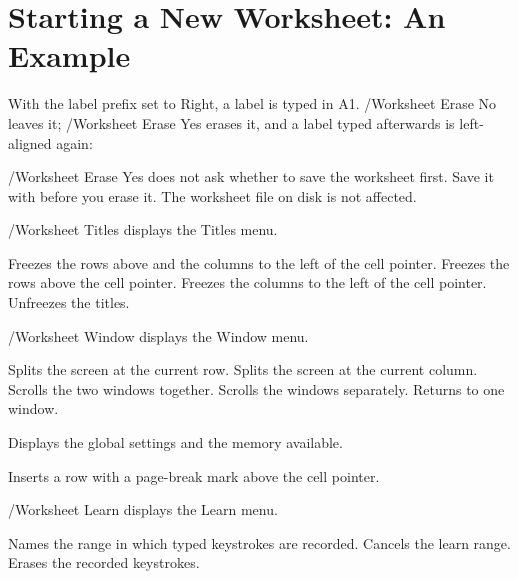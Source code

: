 \section{Starting a New Worksheet: An Example}
With the label prefix set to Right, a label is typed in A1.
/Worksheet Erase No leaves it; /Worksheet Erase Yes erases it, and a label
typed afterwards is left-aligned again:

\begin{Caution}
/Worksheet Erase Yes does not ask whether to save the worksheet first.
Save it with  before you erase it.  The worksheet
file on disk is not affected.
\end{Caution}

/Worksheet Titles displays the Titles menu.
\begin{Options}
 Freezes the rows above and the columns
  to the left of the cell pointer.
 Freezes the rows above the cell
  pointer.
 Freezes the columns to the left of
  the cell pointer.
 Unfreezes the titles.
\end{Options}

/Worksheet Window displays the Window menu.
\begin{Options}
 Splits the screen at the current
  row.
 Splits the screen at the current
  column.
 Scrolls the two windows together.
 Scrolls the windows separately.
 Returns to one window.
\end{Options}

Displays the global settings and the memory available.

Inserts a row with a page-break mark above the cell pointer.

/Worksheet Learn displays the Learn menu.
\begin{Options}
 Names the range in which typed
  keystrokes are recorded.
 Cancels the learn range.
 Erases the recorded keystrokes.
\end{Options}
